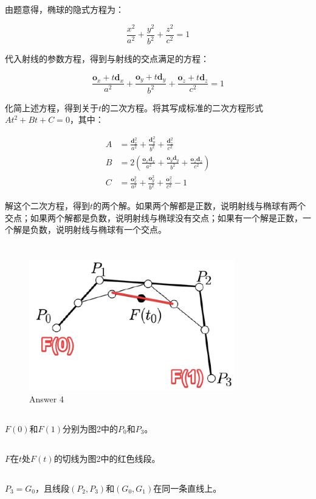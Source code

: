 \documentclass{article}
\begin{document}
由题意得，椭球的隐式方程为：

\[
    \frac{x^2}{a^2} + \frac{y^2}{b^2} + \frac{z^2}{c^2} = 1
\]

代入射线的参数方程，得到与射线的交点满足的方程：

\[
    \frac{\mathbf{o}_x+t\mathbf{d}_x}{a^2} + \frac{\mathbf{o}_y+t\mathbf{d}_y}{b^2} + \frac{\mathbf{o}_z+t\mathbf{d}_z}{c^2} = 1
\]

化简上述方程，得到关于$t$的二次方程。将其写成标准的二次方程形式$At^2+Bt+C=0$，其中：

\[
    \begin{aligned}
        A & = \frac{\mathbf{d}_x^2}{a^2} + \frac{\mathbf{d}_y^2}{b^2} + \frac{\mathbf{d}_z^2}{c^2}                                  \\
        B & = 2(\frac{\mathbf{o}_x\mathbf{d}_x}{a^2} + \frac{\mathbf{o}_y\mathbf{d}_y}{b^2} + \frac{\mathbf{o}_z\mathbf{d}_z}{c^2}) \\
        C & = \frac{\mathbf{o}_x^2}{a^2} + \frac{\mathbf{o}_y^2}{b^2} + \frac{\mathbf{o}_z^2}{c^2} - 1
    \end{aligned}
\]

解这个二次方程，得到$t$的两个解。如果两个解都是正数，说明射线与椭球有两个交点；如果两个解都是负数，说明射线与椭球没有交点；如果有一个解是正数，一个解是负数，说明射线与椭球有一个交点。

\section{}

\begin{figure}
    \centering
    \includegraphics[width=0.8\textwidth]{pic/Acrobat_jD6Pv6U3E4.png}
    \caption{Answer 4}
    \label{fig:answer4}
\end{figure}

\subsection{}

$F(0)$和$F(1)$分别为图2中的$P_0$和$P_3$。

\subsection{}

$F$在$t$处$F(t)$的切线为图2中的红色线段。

\subsection{}

$P_3=G_0$，且线段$(P_2, P_3)$和$(G_0, G_1)$在同一条直线上。
\end{document}

